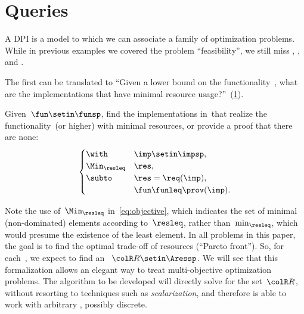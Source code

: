 
\section{Queries}
\label{sec:design-problems-querying}

A DPI is a model to which we can associate a family of optimization problems.
While in previous examples we covered the problem ``feasibility'', we still miss \FixFunMinRes, \FixResMaxFun, and \FeasibleImp.

The first can be translated to ``Given a lower bound on the functionality~\fun, what are the implementations that have minimal resource usage?''~(\cref{fig:setup-1}).

\begin{problem}[\FixFunMinRes]
\label{prob:FixFunMinRes}
Given~$\fun\setin\funsp$, find the implementations in~\impsp that realize the functionality~\fun (or higher) with minimal resources, or provide a proof that there are none:
\begin{equation}
    \label{eq:objective}
    \begin{cases}
        \with          & \imp\setin\impsp,       \\
        \Min_{\resleq} & \res,                   \\
        \subto         & \res=\req(\imp),        \\
                       & \fun\funleq\prov(\imp).
    \end{cases}
\end{equation}
\end{problem}

\begin{figure}
    \centering
    \caption{}
    \label{fig:setup-1}
\end{figure}

\begin{remark}
    Note the use of~$\Min_{\resleq}$ in~\cref{eq:objective},
    which indicates the set of minimal (non-dominated) elements according to~$\resleq$, rather than~$\min_{\resleq}$, which would presume the existence of the least element.
    In all problems in this paper, the goal is to find the optimal trade-off of resources (``Pareto front'').
    So, for each~\fun, we expect to find an ~${\colR R}\setin\Aressp$.
    We will see that this formalization allows an elegant way to treat multi-objective optimization problems.
    The algorithm to be developed will directly solve for the set~${\colR R}$, without resorting to techniques such as \emph{scalarization}, and therefore is able to work with arbitrary , possibly discrete.
\end{remark}

